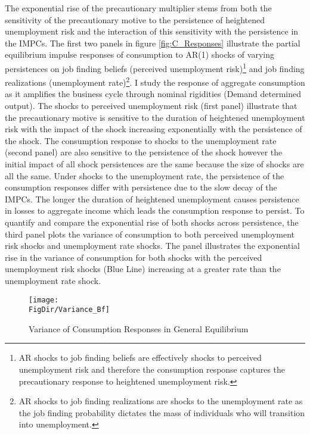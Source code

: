 \documentclass[titlepage]{\econtex}\providecommand{\texname}{Dissertation-Proposal}
\providecommand{\FigDir}{Figures}
\begin{document}
The exponential rise of the precautionary multiplier stems from both the sensitivity of the precautionary motive to the persistence of heightened unemployment risk and the interaction of this sensitivity with the persistence in the IMPCs. The first two panels in figure \ref{fig:C_Responses} illustrate the partial equilibrium impulse responses of consumption to AR(1) shocks of varying persistences on job finding beliefs (perceived unemployment risk)\footnote{AR shocks to job finding beliefs are effectively shocks to perceived unemployment risk and therefore the consumption response captures the precautionary response to heightened unemployment risk.} and job finding realizations (unemployment rate)\footnote{AR shocks to job finding realizations are shocks to the unemployment rate as the job finding probability dictates the mass of individuals who will transition into unemployment.}.  I study the response of aggregate consumption as it amplifies the business cycle through nominal rigidities (Demand determined output). The shocks to perceived unemployment risk (first panel) illustrate that the precautionary motive is sensitive to the duration of heightened unemployment risk with the impact of the shock increasing exponentially with the persistence of the shock. The consumption response to shocks to the unemployment rate (second panel) are also sensitive to the persistence of the shock however the initial impact of all shock persistences are the same because the size of shocks are all the same. Under shocks to the unemployment rate, the persistence of the consumption responses differ with persistence due to the slow decay of the IMPCs. The longer the duration of heightened unemployment causes persistence in losses to aggregate income which leads the consumption response to persist. To quantify and compare the exponential rise of both shocks across persistence, the third panel plots the variance of consumption to both perceived unemployment risk shocks and unemployment rate shocks. The panel illustrates the exponential rise in the variance of consumption for both shocks with the perceived unemployment risk shocks (Blue Line) increasing at a greater rate than the unemployment rate shock. \\


\begin{figure}[H]
    \centering
      \caption{Variance of Consumption Responses in General Equilibrium}
    \texttt{[image: \\FigDir/Variance\_Bf]}
     \label{fig:Variance_GE}
\end{figure}
\end{document}
